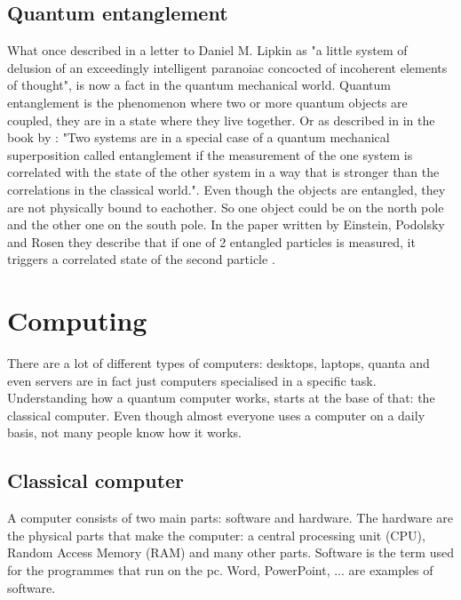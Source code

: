\subsection{Quantum entanglement} \label{quantum entanglement}
What \textcite{Einstein} once described in a letter to Daniel M. Lipkin as "a little system of delusion of an exceedingly intelligent paranoiac concocted of incoherent elements of thought", is now a fact in the quantum mechanical world.
Quantum entanglement is the phenomenon where two or more quantum objects are coupled, they are in a state where they live together.
Or as described in in the book by \textcite{Hidary_2019}: "Two systems are in a special case of a quantum mechanical superposition called entanglement if the measurement of the one system is correlated with the state of the other system in a way that is stronger than the correlations in the classical world.".
Even though the objects are entangled, they are not physically bound to eachother. So one object could be on the north pole and the other one on the south pole.
In the paper written by Einstein, Podolsky and Rosen they describe that if one of 2 entangled particles is measured, it triggers a correlated state of the second particle \autocite{EPR}.


\section{Computing} \label{computing}
There are a lot of different types of computers: desktops, laptops, quanta and even servers are in fact just computers specialised in a specific task.
Understanding how a quantum computer works, starts at the base of that: the classical computer. Even though almost everyone uses a computer on a daily basis, not many people know how it works.


\subsection{Classical computer} \label{classical computer}
A computer consists of two main parts: software and hardware. The hardware are the physical parts that make the computer: a central processing unit (CPU), Random Access Memory (RAM) and many other parts.
Software is the term used for the programmes that run on the pc. Word, PowerPoint, ... are examples of software.

